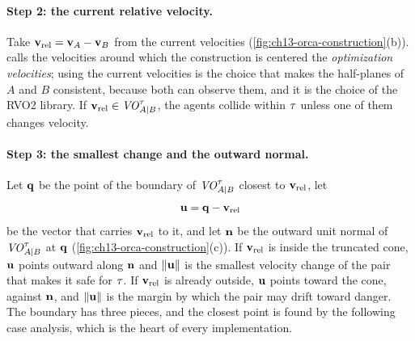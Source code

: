 \paragraph{Step 2: the current relative velocity.}
Take $\mathbf{v}_{\mathrm{rel}} = \mathbf{v}_A - \mathbf{v}_B$ from the current velocities
(\cref{fig:ch13-orca-construction}(b)). \orca calls the velocities around
which the construction is centered the \emph{optimization velocities}; using
the current velocities is the choice that makes the half-planes of $A$ and
$B$ consistent, because both can observe them, and it is the choice of the
RVO2 library. If $\mathbf{v}_{\mathrm{rel}} \in \mathit{VO}^{\tau}_{A|B}$, the agents collide
within $\tau$ unless one of them changes velocity.

\paragraph{Step 3: the smallest change and the outward normal.}
Let $\mathbf{q}$ be the point of the boundary of $\mathit{VO}^{\tau}_{A|B}$ closest to
$\mathbf{v}_{\mathrm{rel}}$, let
\begin{equation}
  \mathbf{u} = \mathbf{q} - \mathbf{v}_{\mathrm{rel}}
  \label{eq:ch13-u}
\end{equation}
be the vector that carries $\mathbf{v}_{\mathrm{rel}}$ to it, and let $\mathbf{n}$ be
the outward unit normal of $\mathit{VO}^{\tau}_{A|B}$ at $\mathbf{q}$
(\cref{fig:ch13-orca-construction}(c)). If $\mathbf{v}_{\mathrm{rel}}$ is inside the
truncated cone, $\mathbf{u}$ points outward along $\mathbf{n}$ and
$\left\lVert \mathbf{u} \right\rVert$ is the smallest velocity change of the pair that makes it
safe for $\tau$. If $\mathbf{v}_{\mathrm{rel}}$ is already outside, $\mathbf{u}$ points
toward the cone, against $\mathbf{n}$, and $\left\lVert \mathbf{u} \right\rVert$ is the margin by
which the pair may drift toward danger. The boundary has three pieces, and
the closest point is found by the following case analysis, which is the
heart of every \orca implementation.

